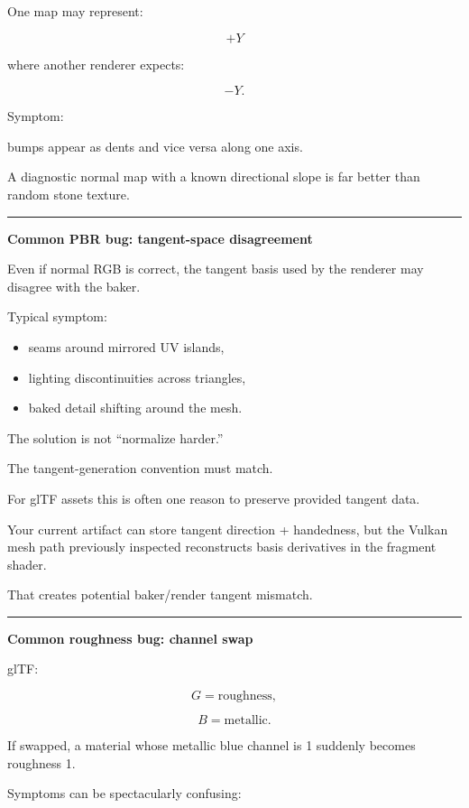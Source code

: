 One map may represent:

\[
+Y
\]

where another renderer expects:

\[
-Y.
\]

Symptom:

bumps appear as dents and vice versa along one axis.

A diagnostic normal map with a known directional slope is far better than random stone texture.

\begin{center}\rule{0.5\linewidth}{0.5pt}\end{center}

\textbf{Common PBR bug: tangent-space disagreement}

Even if normal RGB is correct, the tangent basis used by the renderer may disagree with the baker.

Typical symptom:

\begin{itemize}
\tightlist
\item
  seams around mirrored UV islands,
\item
  lighting discontinuities across triangles,
\item
  baked detail shifting around the mesh.
\end{itemize}

The solution is not ``normalize harder.''

The tangent-generation convention must match.

For glTF assets this is often one reason to preserve provided tangent data.

Your current artifact can store tangent direction + handedness, but the Vulkan mesh path previously inspected reconstructs basis derivatives in the fragment shader.

That creates potential baker/render tangent mismatch.

\begin{center}\rule{0.5\linewidth}{0.5pt}\end{center}

\textbf{Common roughness bug: channel swap}

glTF:

\[
G=\text{roughness},
\]

\[
B=\text{metallic}.
\]

If swapped, a material whose metallic blue channel is 1 suddenly becomes roughness 1.

Symptoms can be spectacularly confusing:

